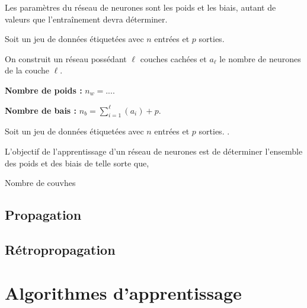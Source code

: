 \begin{defi}[Paramètres]

Les paramètres du réseau de neurones sont les poids et les biais, autant de valeurs que l’entraînement devra déterminer.

\end{defi}
\begin{methode}

Soit un jeu de données étiquetées avec $n$ entrées et $p$ sorties.

On construit un réseau possédant $\ell$ couches cachées et $a_\ell$ le nombre de neurones de la couche  $\ell$.

\textbf{Nombre de poids :} $n_w = ...$.

\textbf{Nombre de bais :} $n_b = \sum\limits_{i=1}^{\ell}\left( a_i  \right)+ p$.



\end{methode}
\begin{obj}
Soit un jeu de données étiquetées avec $n$ entrées et $p$ sorties. .


L'objectif de l'apprentissage d'un réseau de neurones est de déterminer l'ensemble des poids et des biais de telle sorte que, 
\end{obj}



\begin{defi}

Nombre de couvhes
\end{defi}


\subsection{Propagation}

\subsection{Rétropropagation}


\begin{defi}
\end{defi}


\section{Algorithmes d'apprentissage}




\newpage

